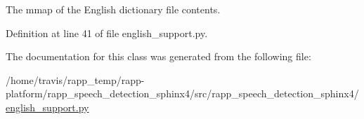 The mmap of the English dictionary file contents. 



Definition at line 41 of file english\-\_\-support.\-py.



The documentation for this class was generated from the following file\-:\begin{DoxyCompactItemize}
\item 
/home/travis/rapp\-\_\-temp/rapp-\/platform/rapp\-\_\-speech\-\_\-detection\-\_\-sphinx4/src/rapp\-\_\-speech\-\_\-detection\-\_\-sphinx4/\hyperlink{english__support_8py}{english\-\_\-support.\-py}\end{DoxyCompactItemize}
